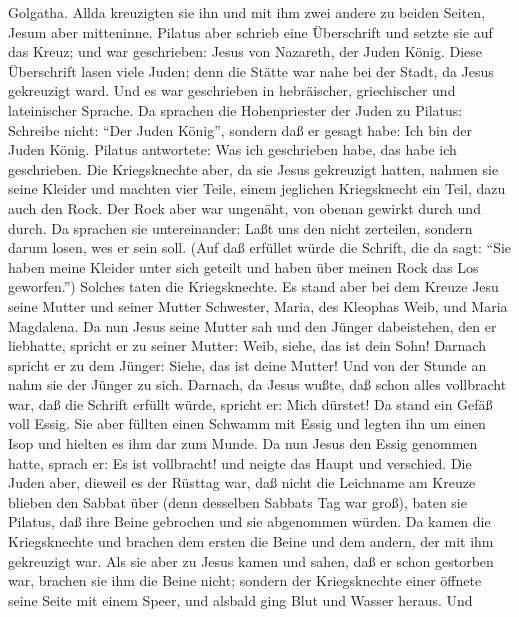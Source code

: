 Golgatha.  Allda kreuzigten sie ihn und mit ihm zwei andere
zu beiden Seiten, Jesum aber mitteninne.  Pilatus aber
schrieb eine Überschrift und setzte sie auf das Kreuz; und war
geschrieben: Jesus von Nazareth, der Juden König.  Diese
Überschrift lasen viele Juden; denn die Stätte war nahe bei der Stadt,
da Jesus gekreuzigt ward. Und es war geschrieben in hebräischer,
griechischer und lateinischer Sprache.  Da sprachen die
Hohenpriester der Juden zu Pilatus: Schreibe nicht: ``Der Juden König'',
sondern daß er gesagt habe: Ich bin der Juden König. 
Pilatus antwortete: Was ich geschrieben habe, das habe ich geschrieben.
 Die Kriegsknechte aber, da sie Jesus gekreuzigt hatten,
nahmen sie seine Kleider und machten vier Teile, einem jeglichen
Kriegsknecht ein Teil, dazu auch den Rock. Der Rock aber war ungenäht,
von obenan gewirkt durch und durch.  Da sprachen sie
untereinander: Laßt uns den nicht zerteilen, sondern darum losen, wes er
sein soll. (Auf daß erfüllet würde die Schrift, die da sagt: ``Sie haben
meine Kleider unter sich geteilt und haben über meinen Rock das Los
geworfen.'') Solches taten die Kriegsknechte.  Es stand
aber bei dem Kreuze Jesu seine Mutter und seiner Mutter Schwester,
Maria, des Kleophas Weib, und Maria Magdalena.  Da nun
Jesus seine Mutter sah und den Jünger dabeistehen, den er liebhatte,
spricht er zu seiner Mutter: Weib, siehe, das ist dein Sohn!
 Darnach spricht er zu dem Jünger: Siehe, das ist deine
Mutter! Und von der Stunde an nahm sie der Jünger zu sich. 
Darnach, da Jesus wußte, daß schon alles vollbracht war, daß die Schrift
erfüllt würde, spricht er: Mich dürstet!  Da stand ein
Gefäß voll Essig. Sie aber füllten einen Schwamm mit Essig und legten
ihn um einen Isop und hielten es ihm dar zum Munde.  Da nun
Jesus den Essig genommen hatte, sprach er: Es ist vollbracht! und neigte
das Haupt und verschied.  Die Juden aber, dieweil es der
Rüsttag war, daß nicht die Leichname am Kreuze blieben den Sabbat über
(denn desselben Sabbats Tag war groß), baten sie Pilatus, daß ihre Beine
gebrochen und sie abgenommen würden.  Da kamen die
Kriegsknechte und brachen dem ersten die Beine und dem andern, der mit
ihm gekreuzigt war.  Als sie aber zu Jesus kamen und sahen,
daß er schon gestorben war, brachen sie ihm die Beine nicht;
 sondern der Kriegsknechte einer öffnete seine Seite mit
einem Speer, und alsbald ging Blut und Wasser heraus.  Und
